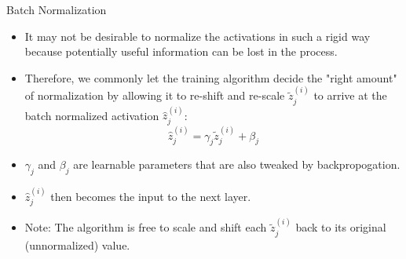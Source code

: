 \begin{frame} {Batch Normalization}
  \begin{itemize}
    \item It may not be desirable to normalize the activations in such a rigid way because potentially useful information can be lost in the process.
    \item Therefore, we commonly let the training algorithm decide the "right amount" of normalization by allowing it to re-shift and re-scale $\tilde z_j^{(i)}$ to arrive at the batch normalized activation $\hat z_j^{(i)}$:
        \begin{equation*}
          \hat z_j^{(i)} = \gamma_j \tilde z_j^{(i)} + \beta_j
        \end{equation*}
    \item $\gamma_j$ and $\beta_j$ are learnable parameters that are also tweaked by backpropogation.
    \item $\hat z_j^{(i)}$ then becomes the input to the next layer.
    \item Note: The algorithm is free to scale and shift each $\tilde z_j^{(i)}$ back to its original (unnormalized) value.
  \end{itemize}
\end{frame}

